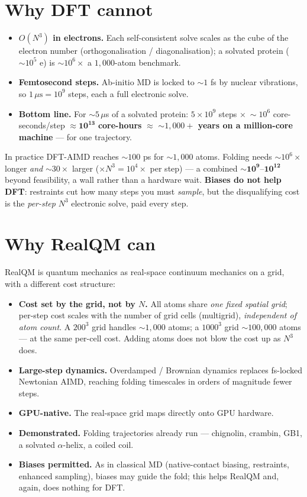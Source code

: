 \documentclass[11pt]{article}
\begin{document}
\section{Why DFT cannot}
\begin{itemize}
\item \textbf{$O(N^3)$ in electrons.} Each self-consistent solve scales as the cube of the electron number
(orthogonalisation / diagonalisation); a solvated protein (${\sim}10^5$ e) is ${\sim}10^6\times$ a
$1{,}000$-atom benchmark.
\item \textbf{Femtosecond steps.} Ab-initio MD is locked to ${\sim}1$ fs by nuclear vibrations, so
$1\,\mu\text{s}=10^9$ steps, each a full electronic solve.
\item \textbf{Bottom line.} For ${\sim}5\,\mu$s of a solvated protein: $5\times10^9$ steps $\times\ {\sim}10^6$
core-seconds/step $\approx \mathbf{10^{13}}$ \textbf{core-hours} $\approx$ \textbf{${\sim}1{,}000+$ years on a
million-core machine} --- for one trajectory.
\end{itemize}
In practice DFT-AIMD reaches ${\sim}100$ ps for ${\sim}1{,}000$ atoms. Folding needs ${\sim}10^6\times$ longer
\emph{and} ${\sim}30\times$ larger ($\times N^3=10^4\times$ per step) --- a combined
$\mathbf{{\sim}10^{9}\text{--}10^{12}}$ beyond feasibility, a wall rather than a hardware wait. \textbf{Biases
do not help DFT}: restraints cut how many steps you must \emph{sample}, but the disqualifying cost is the
\emph{per-step} $N^3$ electronic solve, paid every step.

\section{Why RealQM can}
RealQM is quantum mechanics as real-space continuum mechanics on a grid, with a different cost structure:
\begin{itemize}
\item \textbf{Cost set by the grid, not by $N$.} All atoms share \emph{one fixed spatial grid}; per-step cost
scales with the number of grid cells (multigrid), \emph{independent of atom count}. A $200^3$ grid handles
${\sim}1{,}000$ atoms; a $1000^3$ grid ${\sim}100{,}000$ atoms --- at the same per-cell cost. Adding atoms does
not blow the cost up as $N^3$ does.
\item \textbf{Large-step dynamics.} Overdamped / Brownian dynamics replaces fs-locked Newtonian AIMD, reaching
folding timescales in orders of magnitude fewer steps.
\item \textbf{GPU-native.} The real-space grid maps directly onto GPU hardware.
\item \textbf{Demonstrated.} Folding trajectories already run --- chignolin, crambin, GB1, a solvated
$\alpha$-helix, a coiled coil.
\item \textbf{Biases permitted.} As in classical MD (native-contact biasing, restraints, enhanced sampling),
biases may guide the fold; this helps RealQM and, again, does nothing for DFT.
\end{itemize}
\end{document}
